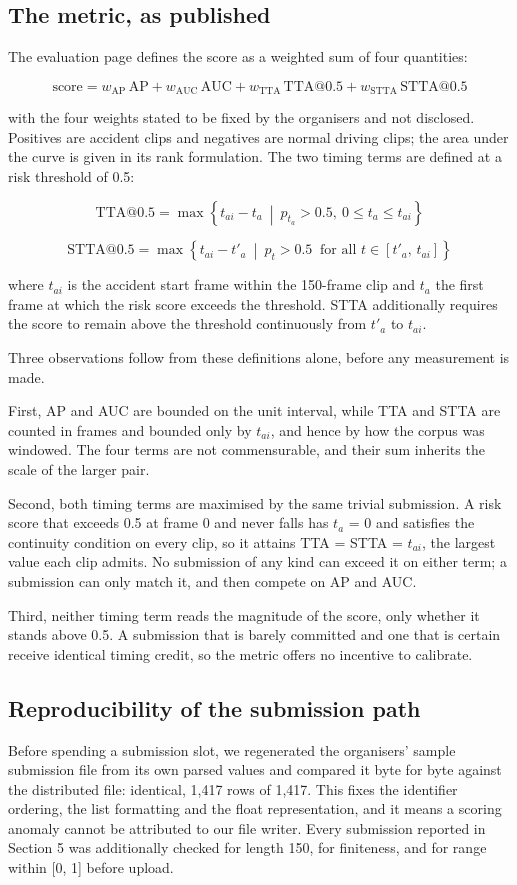\subsection{The metric, as published}
The evaluation page defines the score as a weighted sum of four quantities:

\[\text{score} = w_{\text{AP}}\,\text{AP} + w_{\text{AUC}}\,\text{AUC} + w_{\text{TTA}}\,\text{TTA@0.5} + w_{\text{STTA}}\,\text{STTA@0.5}\]

with the four weights stated to be fixed by the organisers and not disclosed. Positives are accident clips and negatives are normal driving clips; the area under the curve is given in its rank formulation. The two timing terms are defined at a risk threshold of 0.5:

\[\text{TTA@0.5} = \max\left\{ t_{ai} - t_{a} \ \middle|\ p_{t_{a}} > 0.5,\ 0 \leq t_{a} \leq t_{ai} \right\}\]

\[\text{STTA@0.5} = \max\left\{ t_{ai} - t'_{a} \ \middle|\ p_{t} > 0.5 \ \text{ for all } t \in [t'_{a},\,t_{ai}] \right\}\]

where \(t_{ai}\) is the accident start frame within the 150-frame clip and \(t_{a}\) the first frame at which the risk score exceeds the threshold. STTA additionally requires the score to remain above the threshold continuously from \(t'_{a}\) to \(t_{ai}\).

Three observations follow from these definitions alone, before any measurement is made.

First, AP and AUC are bounded on the unit interval, while TTA and STTA are counted in frames and bounded only by \(t_{ai}\), and hence by how the corpus was windowed. The four terms are not commensurable, and their sum inherits the scale of the larger pair.

Second, both timing terms are maximised by the same trivial submission. A risk score that exceeds 0.5 at frame 0 and never falls has \(t_{a}\) = 0 and satisfies the continuity condition on every clip, so it attains TTA = STTA = \(t_{ai}\), the largest value each clip admits. No submission of any kind can exceed it on either term; a submission can only match it, and then compete on AP and AUC.

Third, neither timing term reads the magnitude of the score, only whether it stands above 0.5. A submission that is barely committed and one that is certain receive identical timing credit, so the metric offers no incentive to calibrate.

\subsection{Reproducibility of the submission path}
Before spending a submission slot, we regenerated the organisers'{} sample submission file from its own parsed values and compared it byte for byte against the distributed file: identical, 1,417 rows of 1,417. This fixes the identifier ordering, the list formatting and the float representation, and it means a scoring anomaly cannot be attributed to our file writer. Every submission reported in Section 5 was additionally checked for length 150, for finiteness, and for range within [0, 1] before upload.


